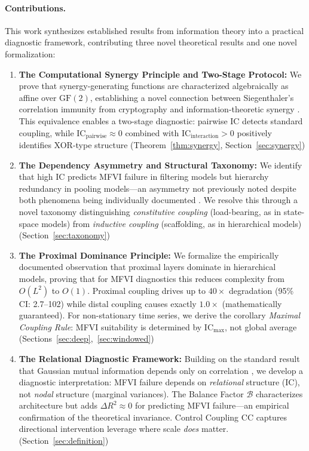 \documentclass[10pt]{article} %
\theoremstyle{plain}
\theoremstyle{definition}
\newcommand{\IC}{\mathrm{IC}}  %
\newcommand{\BB}{\mathcal{B}}  %
\newcommand{\CC}{\mathrm{CC}}  %
\begin{document}
\paragraph{Contributions.} This work synthesizes established results from information theory into a practical diagnostic framework, contributing three novel theoretical results and one novel formalization:
\begin{enumerate}
    \item \textbf{The Computational Synergy Principle and Two-Stage Protocol:} We prove that synergy-generating functions are characterized algebraically as affine over $\text{GF}(2)$, establishing a novel connection between Siegenthaler's correlation immunity \citep{siegenthaler1984correlation} from cryptography and information-theoretic synergy \citep{williams2010nonnegative}. This equivalence enables a two-stage diagnostic: pairwise IC detects standard coupling, while $\IC_{\text{pairwise}} \approx 0$ combined with $\IC_{\text{interaction}} > 0$ positively identifies XOR-type structure (Theorem~\ref{thm:synergy}, Section~\ref{sec:synergy})
    \item \textbf{The Dependency Asymmetry and Structural Taxonomy:} We identify that high IC predicts MFVI failure in filtering models but hierarchy redundancy in pooling models---an asymmetry not previously noted despite both phenomena being individually documented \citep{wang2004convergence,turner2011two}. We resolve this through a novel taxonomy distinguishing \emph{constitutive coupling} (load-bearing, as in state-space models) from \emph{inductive coupling} (scaffolding, as in hierarchical models) (Section~\ref{sec:taxonomy})
    \item \textbf{The Proximal Dominance Principle:} We formalize the empirically documented observation \citep{havtorn2021hierarchical,sonderby2016ladder,zhao2017infovae} that proximal layers dominate in hierarchical models, proving that for MFVI diagnostics this reduces complexity from $O(L^2)$ to $O(1)$. Proximal coupling drives up to $40\times$ degradation (95\% CI: 2.7--102) while distal coupling causes exactly $1.0\times$ (mathematically guaranteed). For non-stationary time series, we derive the corollary \emph{Maximal Coupling Rule}: MFVI suitability is determined by $\IC_{\max}$, not global average (Sections~\ref{sec:deep},~\ref{sec:windowed})
    \item \textbf{The Relational Diagnostic Framework:} Building on the standard result that Gaussian mutual information depends only on correlation \citep{gelfand1959calculation,cover2006elements}, we develop a diagnostic interpretation: MFVI failure depends on \emph{relational} structure (IC), not \emph{nodal} structure (marginal variances). The Balance Factor $\BB$ characterizes architecture but adds $\Delta R^2 \approx 0$ for predicting MFVI failure---an empirical confirmation of the theoretical invariance. Control Coupling $\CC$ captures directional intervention leverage where scale \emph{does} matter. (Section~\ref{sec:definition})
\end{enumerate}
\end{document}
